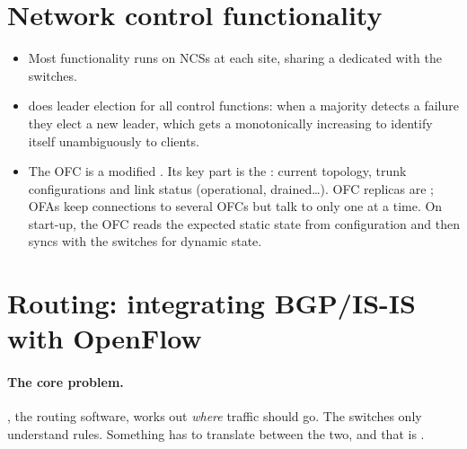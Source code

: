 \section{Network control functionality}
\begin{itemize}
\item Most functionality runs on NCSs at each site, sharing a dedicated  with the switches.
\item {} does leader election for all control functions: when a majority detects a failure they elect a new leader, which gets a monotonically increasing  to identify itself unambiguously to clients.
\item The OFC is a modified . Its key part is the : current topology, trunk configurations and link status (operational, drained\ldots). OFC replicas are ; OFAs keep connections to several OFCs but talk to only one at a time. On start-up, the OFC reads the expected static state from configuration and then syncs with the switches for dynamic state.
\end{itemize}

\section{Routing: integrating BGP/IS-IS with OpenFlow}

\paragraph{The core problem.} , the routing software, works out \emph{where} traffic should go. The switches only understand  rules. Something has to translate between the two, and that is .

